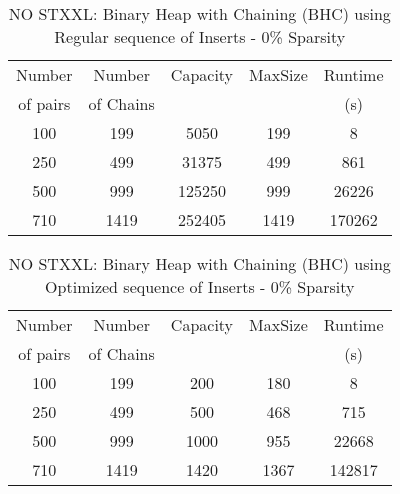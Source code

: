 \documentclass[11pt, one-sided]{amsart}
\begin{document}
\begin{table}[htbp]
   \centering
      \caption{NO STXXL: Binary Heap with Chaining (BHC) using Regular sequence of Inserts  - 0\% Sparsity} 
   \begin{tabular}{|c|c|c|c|c|}
   	\hline
		 Number   & Number		& Capacity	& MaxSize	&	Runtime		\\ 
		 of pairs 	& of Chains  	& 			&  			& 	 (s)			\\ \hline
		 100		& 199 	       	& 5050	     	&	199	      	&	8			\\
		 250		& 499   	       	& 31375    	& 499	      	&	 861			\\
		 500		& 999	      	&125250    	&	999         	&	26226		\\
		 710		& 1419	   	&252405    	&	1419	      	&	170262		\\
	\hline
   \end{tabular}
   \label{tab:booktabs}
\end{table}



\newpage



\begin{table}[htbp]
   \centering
      \caption{NO STXXL: Binary Heap with Chaining (BHC) using Optimized sequence of Inserts  - 0\% Sparsity} 
   \begin{tabular}{|c|c|c|c|c|}
   	\hline
		 Number	& 	Number    		& 	Capacity 	& 	MaxSize 	& Runtime    	 		 \\ 
		 of pairs 	& 	of Chains 		&			& 			&	 (s)				\\ \hline
		 100		& 	199 	   		&	 200	    	&	180	      	&	8	       			\\
		 250		& 	499   	   	&	500   	& 	468	      	&       715	       			\\
		 500		& 	999	   		&	1000	  	&	955	     	&	22668			\\
		 710		& 	1419	   		&	1420	   	&	1367	      	& 	142817         		\\
	\hline
   \end{tabular}
   \label{tab:booktabs}
\end{table}
\end{document}
